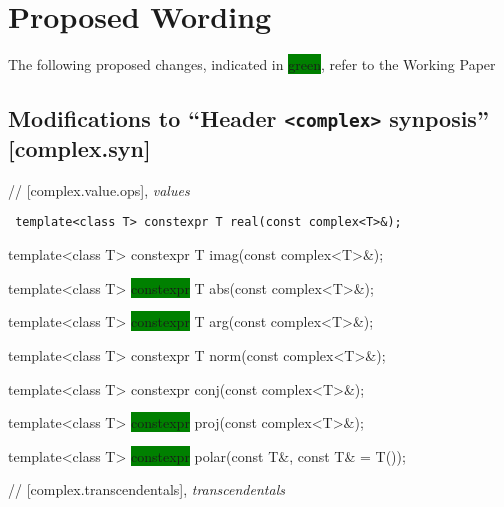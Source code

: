 \documentclass[prd,twocolumn,amsmath,amssymb,nofootinbib,eqsecnum]{revtex4-1}
\newcommand{\code}[1]{{\tt #1}}
\newcommand{\header}[1]{{\tt <#1>}}
\newcommand{\highlight}[1]{\colorbox{green}{\!\!\!\! #1}}
\begin{document}
\newpage

\onecolumngrid

\section{Proposed Wording}

\setlength{\parindent}{0pt}


The following proposed changes, indicated in \highlight{green}, refer to the Working Paper~\cite{WorkingPaper}


\subsection{Modifications to ``Header \header{complex} synposis'' [complex.syn]}

// [complex.value.ops], {\it values }

\vspace{2ex}

\code{
  	template<class T> constexpr T real(const complex<T>\&);
	
  	template<class T> constexpr T imag(const complex<T>\&);

	\vspace{2ex}

	template<class T> \highlight{constexpr} T abs(const complex<T>\&);
 	
	template<class T> \highlight{constexpr} T arg(const complex<T>\&);
	
	template<class T> constexpr T norm(const complex<T>\&);
	
	\vspace{2ex}
	
	template<class T> constexpr conj(const complex<T>\&);
	
	template<class T> \highlight{constexpr} proj(const complex<T>\&);
	
	template<class T> \highlight{constexpr} polar(const T\&, const T\& = T());	

}

\vspace{2ex}

// [complex.transcendentals], {\it transcendentals}
\end{document}
